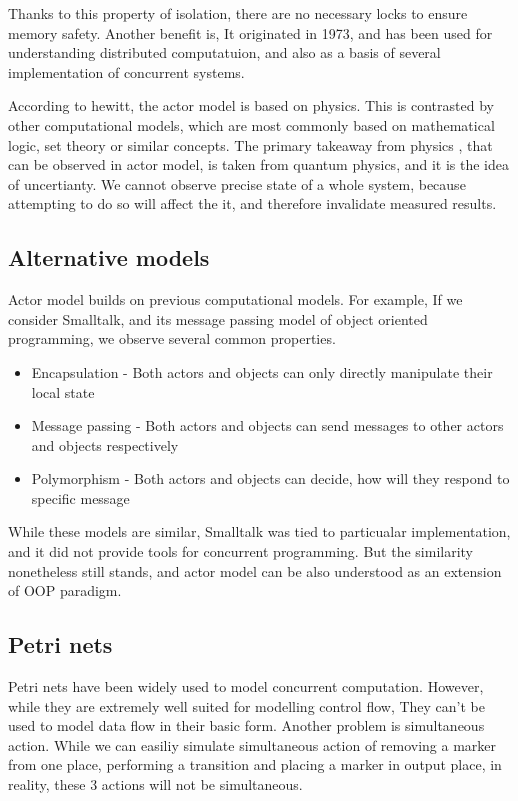Thanks to this property of isolation, there are no necessary locks to ensure memory safety. Another benefit is,
It originated in 1973, and has been used for understanding distributed computatuion, and also as
a basis of several implementation of concurrent systems.

According to hewitt\cite{journal:actor}, the actor model is based on physics. This is contrasted by
other computational models, which are most commonly based on mathematical logic, set theory or similar concepts.
The primary takeaway from physics , that can be observed in actor model, is taken from quantum physics, and it
is the idea of uncertianty. We cannot observe precise state of a whole system, because attempting to do so
will affect the it, and therefore invalidate measured results.

\subsection{Alternative models}
Actor model builds on previous computational models. For example, If we consider Smalltalk, and its message
passing model of object oriented programming, we observe several common properties.
\begin{itemize}
    \item Encapsulation - Both actors and objects can only directly manipulate their local state
    \item Message passing - Both actors and objects can send messages to other actors and objects respectively
    \item Polymorphism - Both actors and objects can decide, how will they respond to specific message
\end{itemize}

While these models are similar, Smalltalk was tied to particualar implementation, and it did not provide
tools for concurrent programming. But the similarity nonetheless still stands, and actor model can be also understood as
an extension of OOP paradigm.

\subsection{Petri nets}
Petri nets have been widely used to model concurrent computation. However, while they are extremely well suited
for modelling control flow, They can't be used to model data flow in their basic form. Another problem is
simultaneous action. While we can easiliy simulate simultaneous action of removing a marker from one place, performing
a transition and placing a marker in output place, in reality, these 3 actions will not be simultaneous.

